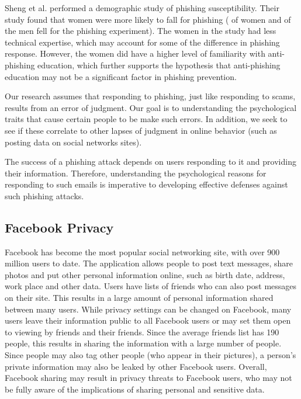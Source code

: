 \documentclass{sig-alternate}
\begin{document}
Sheng et al. \cite {SHK10} performed a demographic study of phishing susceptibility. Their study found that women were more likely to fall for phishing ( of women and  of the men fell for the phishing experiment). The women in the study had less technical expertise, which may account for some of the difference in phishing response. However, the women did have a higher level of familiarity with anti-phishing education, which further supports the hypothesis that anti-phishing education may not be a significant factor in phishing prevention.





Our research assumes that responding to phishing, just like responding to scams, results from an error of judgment. Our goal is to understanding the psychological traits that cause certain people to be make such errors. In addition, we seek to see if these correlate to other lapses of judgment in online behavior (such as posting data on social networks sites).

The success of a phishing attack depends on users responding to it and providing their information. Therefore, understanding the psychological 
reasons for responding to such emails is imperative to 
developing
effective defenses against such phishing attacks.


\subsection{Facebook Privacy} 



Facebook has become the most popular social networking site, with over 900 million users to date. The application allows people to post text messages, share photos and put other personal information online, such as birth 
date, address, work place and other data. Users have lists of friends who can also post messages on their site. This results in a large amount of personal information shared between many users. While privacy settings can be changed on Facebook, many users leave their information public to all Facebook users or may set them open to viewing by friends and their friends. Since the average friends list has 190 people, this results in sharing the information with a large number of people. Since people may also tag other people (who appear in their pictures), a person's private information may also be leaked by other Facebook users. Overall, Facebook sharing may result in privacy threats to Facebook users, who may not be fully aware of the implications of sharing personal and sensitive data. 
\end{document}
